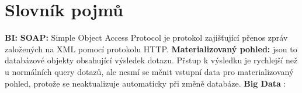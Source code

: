 \documentclass[czech,BP]{thesiskiv}
\begin{document}
% 
%
\chapter{Slovník pojmů}
\textbf{BI:}  \cite{BI} \label{BI_slovnik}
\newline \textbf{SOAP:} Simple Object Access Protocol je protokol zajišťující přenos zpráv založených na XML pomocí protokolu HTTP.
\newline \textbf{Materializovaný pohled:} jsou to databázové objekty obsahující výsledek dotazu. Přstup k výsledku je rychlejší než u normálních query dotazů, ale nesmí se měnit vstupní data pro materializovaný pohled, protože se neaktualizuje automaticky při změně databáze.
\newline
\textbf{Big Data} :  \cite{BigData}

{\raggedright\small

}
\end{document}
